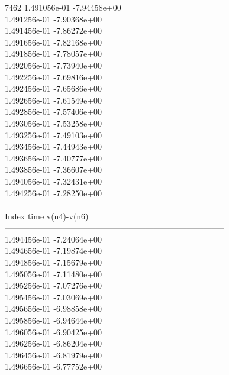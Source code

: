 7462	1.491056e-01	-7.94458e+00	\\ 	1.491256e-01	-7.90368e+00	\\ 	1.491456e-01	-7.86272e+00	\\ 	1.491656e-01	-7.82168e+00	\\ 	1.491856e-01	-7.78057e+00	\\ 	1.492056e-01	-7.73940e+00	\\ 	1.492256e-01	-7.69816e+00	\\ 	1.492456e-01	-7.65686e+00	\\ 	1.492656e-01	-7.61549e+00	\\ 	1.492856e-01	-7.57406e+00	\\ 	1.493056e-01	-7.53258e+00	\\ 	1.493256e-01	-7.49103e+00	\\ 	1.493456e-01	-7.44943e+00	\\ 	1.493656e-01	-7.40777e+00	\\ 	1.493856e-01	-7.36607e+00	\\ 	1.494056e-01	-7.32431e+00	\\ 	1.494256e-01	-7.28250e+00	\\ \hline
\\ \hline
Index   time            v(n4)-v(n6)     \\ \hline
--------------------------------------------------------------------------------\\ 	1.494456e-01	-7.24064e+00	\\ 	1.494656e-01	-7.19874e+00	\\ 	1.494856e-01	-7.15679e+00	\\ 	1.495056e-01	-7.11480e+00	\\ 	1.495256e-01	-7.07276e+00	\\ 	1.495456e-01	-7.03069e+00	\\ 	1.495656e-01	-6.98858e+00	\\ 	1.495856e-01	-6.94644e+00	\\ 	1.496056e-01	-6.90425e+00	\\ 	1.496256e-01	-6.86204e+00	\\ 	1.496456e-01	-6.81979e+00	\\ 	1.496656e-01	-6.77752e+00	\\ \hline
